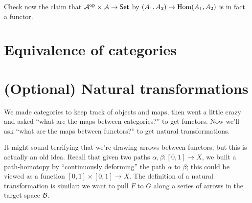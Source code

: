 \begin{exercise}
	Check now the claim that $\mathcal A^{\mathrm{op}} \times \mathcal A \to \mathsf{Set}$
	by $(A_1, A_2) \mapsto \operatorname{Hom}(A_1, A_2)$ is in fact a functor.
\end{exercise}

\section{Equivalence of categories}

\section{(Optional) Natural transformations}
We made categories to keep track of objects and maps, then went a little crazy and asked
``what are the maps between categories?'' to get functors.
Now we'll ask ``what are the maps between functors?'' to get natural transformations.

It might sound terrifying that we're drawing arrows between functors, but this is actually an old idea.
Recall that given two paths $\alpha, \beta \colon [0,1] \to X$,
we built a path-homotopy by ``continuously deforming'' the path $\alpha$ to $\beta$;
this could be viewed as a function $[0,1] \times [0,1] \to X$.
The definition of a natural transformation is similar: we want to pull $F$ to $G$
along a series of arrows in the target space $\mathcal B$.

